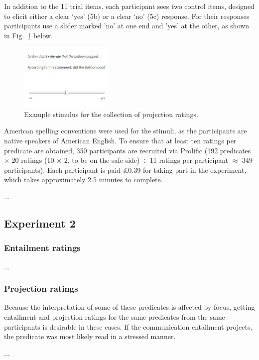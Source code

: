 \documentclass[11pt,fleqn]{article}
\newcommand{\figref}[1]{Fig.~\ref{#1}}
\newcommand{\6}{\mbox{$[\hspace*{-.6mm}[$}}
\newcommand{\9}{\mbox{$]\hspace*{-.6mm}]$}}
\begin{document}
In addition to the 11 trial items, each participant sees two control items, designed to elicit either a clear `yes' (5b) or a clear `no' (5c) response. For their responses participants use a slider marked 'no' at one end and 'yes' at the other, as shown in \figref{exquest} below.

\begin{figure}[H]
	\centering
	\includegraphics[width=0.4\textwidth]{example-question}
	\caption{Example stimulus for the collection of projection ratings.}
	\label{exquest}
\end{figure}

American spelling conventions were used for the stimuli, as the participants are native speakers of American English. To ensure that at least ten ratings per predicate are obtained, 350 participants are recruited via Prolific (192 predicates \(\times\) 20 ratings (10 \(\times\) 2, to be on the safe side) \(\div\) 11 ratings per participant \(\approx\) 349 participants). Each participant is paid £0.39 for taking part in the experiment, which takes approximately 2.5 minutes to complete.

...

\subsection{Experiment 2}
\subsubsection{Entailment ratings}

...

\subsubsection{Projection ratings}

Because the interpretation of some of these predicates is affected by focus, getting entailment and projection ratings for the same predicates from the same participants is desirable in these cases. If the communication entailment projects, the predicate was most likely read in a stressed manner.

...


\pagebreak



\end{document}
